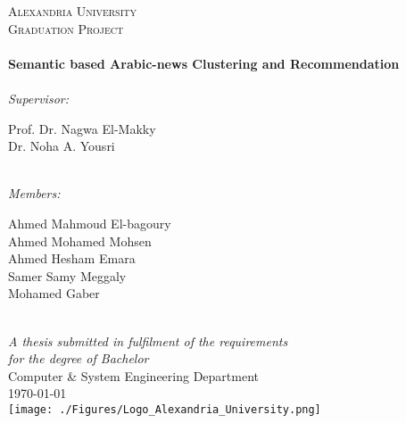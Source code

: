 \documentclass[11pt, a4paper, oneside]{Thesis} %
\begin{document}
\begin{titlepage}
\begin{center}

\textsc{\LARGE Alexandria University}\\[1.5cm] %
\textsc{\Large Graduation Project}\\[0.5cm] %

\HRule \\[0.4cm] %
{\huge \bfseries Semantic based Arabic-news Clustering and Recommendation}\\[0.4cm] %
\HRule \\[1cm] %

\large \textit{Supervisor:}\\[0.4cm]
\begin{minipage}{0.4\textwidth}
\begin{center} \large
Prof. Dr. Nagwa El-Makky\\
Dr. Noha A. Yousri 
\end{center}
\end{minipage}\\[1cm]
 
\large \textit{Members:}\\[0.4cm]
\begin{minipage}{0.4\textwidth}
\begin{center} \large
Ahmed Mahmoud El-bagoury \\ Ahmed Mohamed Mohsen \\ 
Ahmed Hesham Emara \\ Samer Samy Meggaly \\
Mohamed Gaber
\end{center}
\end{minipage}\\[1cm]
 
\large \textit{A thesis submitted in fulfilment of the requirements\\ for the degree of Bachelor }\\[0.4cm] %
Computer \& System Engineering Department\\[0.7cm] %
 
{\large \today}\\[0.4cm] %
\texttt{[image: ./Figures/Logo\_Alexandria\_University.png]} %
\vfill 
\end{center}

\end{titlepage}
\end{document}
